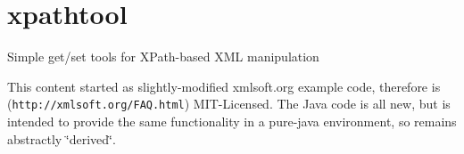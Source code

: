 \section*{xpathtool }

Simple get/set tools for X\+Path-\/based X\+M\+L manipulation

This content started as slightly-\/modified xmlsoft.\+org example code, therefore is ({\tt http\+://xmlsoft.\+org/\+F\+A\+Q.\+html}) M\+I\+T-\/\+Licensed. The Java code is all new, but is intended to provide the same functionality in a pure-\/java environment, so remains abstractly \char`\"{}derived\char`\"{}. 